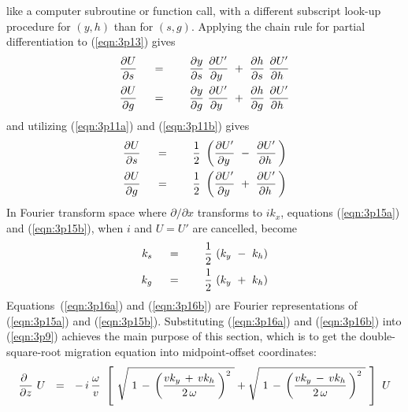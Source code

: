 like a computer subroutine or function call,
with a different subscript look-up procedure
for  $(y,h)$  than for  $(s,g)$.
Applying the chain rule for partial differentiation to (\ref{eqn:3p13}) gives
\begin{eqnarray}
{ \partial U \over \partial s} \ \ \ \ &=&\ \ \ \ 
{ \partial y \over \partial s} \  { \partial U'    \over  \partial y \ } \ +\ 
{ \partial h \over \partial s} \  { \partial U'    \over  \partial h \ }
\label{eqn:3p14a}
\\
{ \partial U \over \partial g}\ \ \ \ &=&\ \ \ \ 
{ \partial y \over \partial g} \  { \partial U'    \over  \partial y \ }\ +\ 
{ \partial h \over \partial g}\  { \partial U'    \over  \partial h \ }
\label{eqn:3p14b}
\end{eqnarray}
and utilizing (\ref{eqn:3p11a}) and (\ref{eqn:3p11b}) gives
\begin{eqnarray}
{ \partial U   \over  \partial s }\ \ \ \ &=&\ \ \ \ 
{1 \over 2 }\ \left( { \partial U'    \over  \partial y \, }\ -\ 
{ \partial U'    \over  \partial h \, } \, \right)
\label{eqn:3p15a}
\\
{ \partial U   \over  \partial g }\ \ \ \ &=&\ \ \ \ 
{1 \over 2 }\  \left( { \partial U'    \over  \partial y \, }\ +\ 
{ \partial U'    \over  \partial h \, } \, \right)
\label{eqn:3p15b}
\end{eqnarray}
In Fourier transform space
where  $ \partial / \partial x $  transforms to  $ i k_x $,
equations (\ref{eqn:3p15a}) and (\ref{eqn:3p15b}),
when  $i$  and $U =  U'  $  are cancelled, become
\begin{eqnarray}
k_s\ \ \ \ &=&\ \ \ \ {1 \over 2 }\ ( k_y\ -\ k_h )
\label{eqn:3p16a}
\\
k_g\ \ \ \ &=&\ \ \ \ {1 \over 2 }\  ( k_y\ +\ k_h )
\label{eqn:3p16b}
\end{eqnarray}
Equations~(\ref{eqn:3p16a})
and (\ref{eqn:3p16b})
are Fourier representations of (\ref{eqn:3p15a}) and (\ref{eqn:3p15b}).
Substituting (\ref{eqn:3p16a}) and (\ref{eqn:3p16b})
into (\ref{eqn:3p9}) achieves the main purpose of this section,
which is to get the double-square-root migration equation
into midpoint-offset coordinates:
\begin{equation}
{\partial\   \over \partial z} \ U\ \ =\ \  -\,i \, 
{\omega \over v }\  \left[ \  \sqrt{\ 
1\,-\,\left( { v k_y \,+\, v k_h   \over  2\,\omega } \, \right)^2
\  } + 
\sqrt{\ 
1\,-\,\left( { v k_y \,-\, v k_h   \over  2\,\omega } \, \right)^2
\  } \  \right] \ U
\label{eqn:3p17}
\end{equation}
\par
